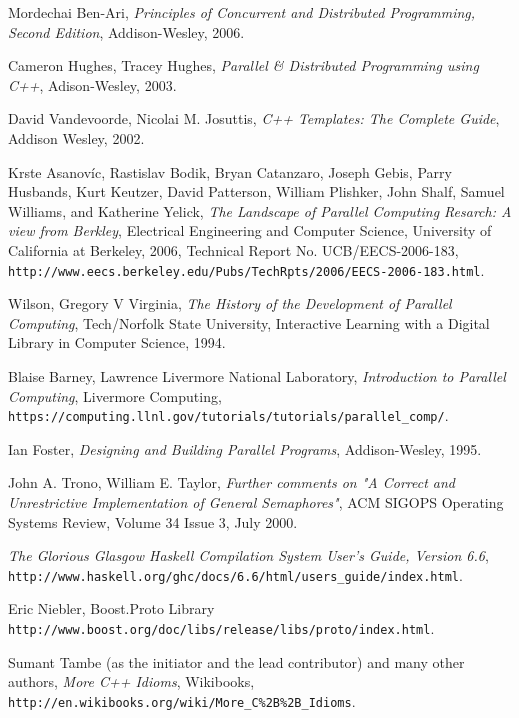 
\begin{thebibliography}{99}

 Mordechai Ben-Ari, \textit{Principles of Concurrent and Distributed Programming,
  Second Edition}, Addison-Wesley, 2006.

 Cameron Hughes, Tracey Hughes, \textit{Parallel \& Distributed Programming using C++},
  Adison-Wesley, 2003.

 David Vandevoorde, Nicolai M. Josuttis, \textit{C++ Templates: The Complete Guide},
  Addison Wesley, 2002.

 Krste Asanovíc, Rastislav Bodik, Bryan Catanzaro, Joseph Gebis,
  Parry Husbands, Kurt Keutzer, David Patterson,
  William Plishker, John Shalf, Samuel Williams, and Katherine Yelick,
  \textit{The Landscape of Parallel Computing Resarch: A view from Berkley},
  Electrical Engineering and Computer Science, University of California at Berkeley, 2006,
  Technical Report No. UCB/EECS-2006-183,
  \texttt{http://www.eecs.berkeley.edu/Pubs/TechRpts/2006/EECS-2006-183.html}.

 Wilson, Gregory V Virginia, \textit{The History of the Development of Parallel Computing}, Tech/Norfolk State University, Interactive Learning with a Digital Library in Computer Science, 1994.

 Blaise Barney, Lawrence Livermore National Laboratory, \textit{Introduction to Parallel Computing}, Livermore Computing, \texttt{https://computing.llnl.gov/tutorials/tutorials/parallel\_comp/}.

 Ian Foster, \textit{Designing and Building Parallel Programs}, Addison-Wesley, 1995.

 John A. Trono,	William E. Taylor, \textit{Further comments on "A Correct and Unrestrictive Implementation of General Semaphores"}, ACM SIGOPS Operating Systems Review, Volume 34 Issue 3, July 2000.

 \textit{The Glorious Glasgow Haskell Compilation System User's Guide, Version 6.6}, \texttt{http://www.haskell.org/ghc/docs/6.6/html/users\_guide/index.html}.

 Eric Niebler, Boost.Proto Library \texttt{http://www.boost.org/doc/libs/release/libs/proto/index.html}.

 Sumant Tambe (as the initiator and the lead contributor) and many other authors, \textit{More C++ Idioms}, Wikibooks, \texttt{http://en.wikibooks.org/wiki/More\_C\%2B\%2B\_Idioms}.


\end{thebibliography}
